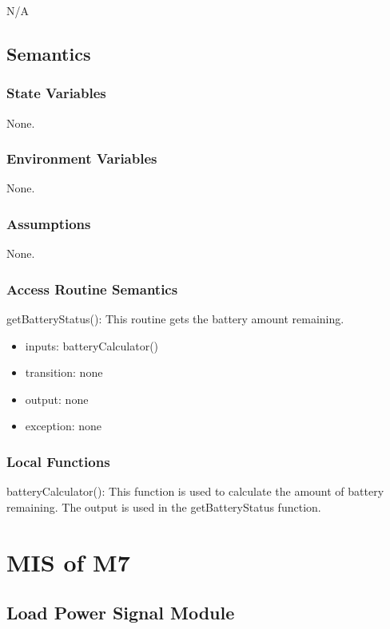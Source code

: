 \documentclass[12pt, titlepage]{article}
\begin{document}
N/A

\subsection{Semantics}

\subsubsection{State Variables}

None.


\subsubsection{Environment Variables}

None.


\subsubsection{Assumptions}

None.

\subsubsection{Access Routine Semantics}

\noindent getBatteryStatus():
This routine gets the battery amount remaining.
\begin{itemize}
\item inputs: batteryCalculator()
\item transition: none
\item output: none
\item exception: none
\end{itemize}

\subsubsection{Local Functions}

\noindent batteryCalculator():
This function is used to calculate the amount of battery remaining. The output is used in the getBatteryStatus function.




\section{MIS of M7  \label{LoadPowerSignal}}

\subsection{Load Power Signal Module}
\end{document}
